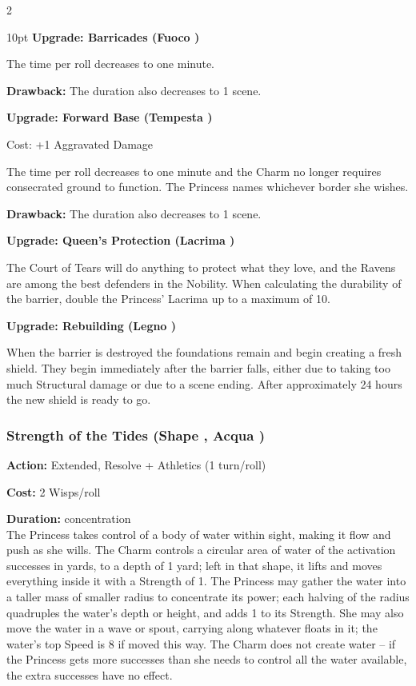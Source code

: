 \begin{multicols}{2}
\begin{myindentpar}{10pt}
\textbf{Upgrade: Barricades (Fuoco \textbullet\textbullet\textbullet)}

The time per roll decreases to one minute. 

\textbf{Drawback:} The duration also decreases to 1 scene. 

\textbf{Upgrade: Forward Base (Tempesta \textbullet\textbullet)}

Cost: +1 Aggravated Damage

The time per roll decreases to one minute and the Charm no longer requires consecrated ground to function. The Princess names whichever border she wishes.

\textbf{Drawback:} The duration also decreases to 1 scene. 

\textbf{Upgrade: Queen's Protection (Lacrima \textbullet)}

The Court of Tears will do anything to protect what they love, and the Ravens are among the best defenders in the Nobility. When calculating the durability of the barrier, double the Princess' Lacrima up to a maximum of 10. 

\textbf{Upgrade: Rebuilding (Legno \textbullet\textbullet\textbullet)}

When the barrier is destroyed the foundations remain and begin creating a fresh shield. They begin immediately after the barrier falls, either due to taking too much Structural damage or due to a scene ending. After approximately 24 hours the new shield is ready to go. 

\end{myindentpar}

\subsubsection*{Strength of the Tides (Shape \textbullet\textbullet\textbullet, Acqua \textbullet\textbullet)}

\noindent \textbf{Action:} Extended, Resolve + Athletics (1 turn/roll)

\noindent \textbf{Cost:} 2 Wisps/roll

\noindent \textbf{Duration:} concentration \\

\noindent The Princess takes control of a body of water within sight, making it flow and push as she wills. The Charm controls a circular area of water of the activation successes in yards, to a depth of 1 yard; left in that shape, it lifts and moves everything inside it with a Strength of 1. The Princess may gather the water into a taller mass of smaller radius to concentrate its power; each halving of the radius quadruples the water's depth or height, and adds 1 to its Strength. She may also move the water in a wave or spout, carrying along whatever floats in it; the water's top Speed is 8 if moved this way. The Charm does not create water -- if the Princess gets more successes than she needs to control all the water available, the extra successes have no effect.


\end{multicols}
